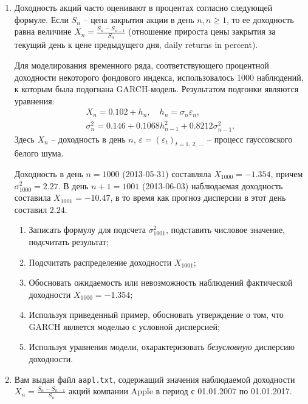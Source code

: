 \documentclass[a4paper,14pt]{extreport}
\renewcommand{\=}[1]{\stackrel{#1}{=}} %
\newcommand{\discretetime}{t = 1,\,2,\,\ldots}
\newcommand{\newprocessd}[1]{
	\ensuremath{
		#1 = \left(#1 _t\right)_{\discretetime}
	}
}
\begin{document}
\begin{enumerate}
	\item 
	Доходность акций часто оценивают в процентах согласно следующей формуле.
	Если $S_n$ -- цена закрытия акции в день $n, n \geqslant 1$, то ее доходность равна величине
	$X_n = \frac{S_n - S_{n-1}}{S_n}$ (отношение прироста цены закрытия
	за текущий день к цене предыдущего дня, daily returns in percent). 

	Для моделирования временного ряда, соответствующего процентной
	доходности некоторого фондового индекса, использовалось 1000 наблюдений,
	к которым была подогнана GARCH-модель. Результатом подгонки являются уравнения:
	\begin{align*}
	X_n = 0.102 + h_n, 
	\quad 
	h_n = \sigma_n \varepsilon_n, \\
	\sigma_n^2 = 0.146 + 0.1068 h_{n-1}^2 + 0.8212 \sigma_{n-1}^2.
	\end{align*}
	Здесь $X_n$ -- доходность в день $n$, $\newprocessd{\varepsilon}$ --
	процесс гауссовского белого шума.

	Доходность в день $n = 1000$ (2013-05-31) составляла
	$X_{1000} = -1.354$, причем $\sigma^2_{1000} =  2.27$.
	В день $n + 1 = 1001$ (2013-06-03)
	наблюдаемая доходность составила $X_{1001} = -10.47$,
	в то время как прогноз дисперсии в этот день составил $2.24$.

	\begin{enumerate}
	\item Записать формулу для подсчета $\sigma^2_{1001}$, 
	подставить числовое значение, подсчитать результат;
	\item Подсчитать распределение доходности $X_{1001}$;
	\item Обосновать ожидаемость или невозможность наблюдений
	фактической доходности $X_{1000} = -1.354$;
	\item Используя приведенный пример, обосновать утверждение
	о том, что GARCH является моделью с условной дисперсией;
	\item Используя уравнения модели, охарактеризовать
	{\em безусловную} дисперсию доходности.
	\end{enumerate}

	\item Вам выдан файл \texttt{aapl.txt}, содержащий
	значения наблюдаемой доходности
	$X_n = \frac{S_n - S_{n-1}}{S_n}$ акций компании Apple 
	в период с 01.01.2007 по 01.01.2017.


\end{enumerate}
\end{document}
